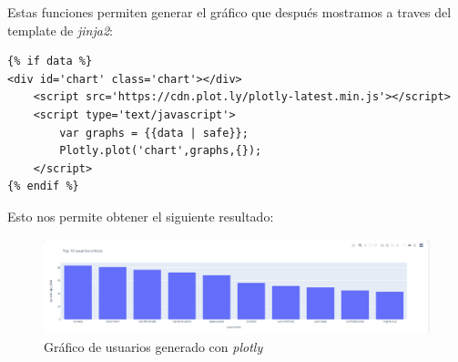 \documentclass[12pt, a4paper,twoside,titlepage]{article}
\begin{document}
Estas funciones permiten generar el gráfico que después mostramos a traves del template de \emph{jinja2}: 
\begin{verbatim}
{% if data %}
<div id='chart' class='chart'></div>
    <script src='https://cdn.plot.ly/plotly-latest.min.js'></script>
    <script type='text/javascript'>
        var graphs = {{data | safe}};
        Plotly.plot('chart',graphs,{});
    </script>
{% endif %}
\end{verbatim}
Esto nos permite obtener el siguiente resultado:
\begin{figure}[H]
    \centering
    \includegraphics[width=1\linewidth]{Figuras/users-graph.png}
    \caption{Gráfico de usuarios generado con \emph{plotly}}
    \label{fig:graphusers}
\end{figure}
\end{document}
